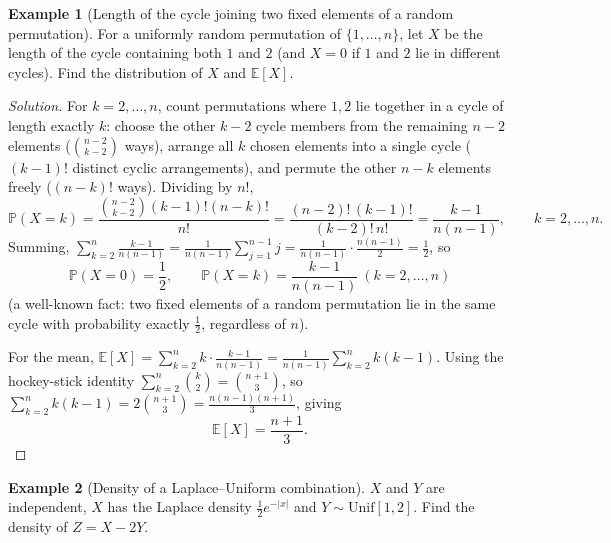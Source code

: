 \documentclass[11pt]{article}
\theoremstyle{definition}
\newtheorem{example}{Example}[section]
\newcommand{\E}{\mathbb{E}}
\begin{document}
\begin{example}[Length of the cycle joining two fixed elements of a random permutation]
For a uniformly random permutation of $\{1,\dots,n\}$, let $X$ be the length of the cycle containing both $1$ and $2$ (and $X=0$ if $1$ and $2$ lie in different cycles). Find the distribution of $X$ and $\E[X]$.
\end{example}

\begin{proof}[Solution]
For $k=2,\dots,n$, count permutations where $1,2$ lie together in a cycle of length exactly $k$: choose the other $k-2$ cycle members from the remaining $n-2$ elements ($\binom{n-2}{k-2}$ ways), arrange all $k$ chosen elements into a single cycle ($(k-1)!$ distinct cyclic arrangements), and permute the other $n-k$ elements freely ($(n-k)!$ ways). Dividing by $n!$,
\[
\mathbb P(X=k)=\frac{\binom{n-2}{k-2}(k-1)!(n-k)!}{n!}=\frac{(n-2)!\,(k-1)!}{(k-2)!\,n!}=\frac{k-1}{n(n-1)}, \qquad k=2,\dots,n.
\]
Summing, $\sum_{k=2}^n\frac{k-1}{n(n-1)}=\frac{1}{n(n-1)}\sum_{j=1}^{n-1}j=\frac{1}{n(n-1)}\cdot\frac{n(n-1)}2=\frac12$, so
\[
\boxed{\mathbb P(X=0)=\frac12, \qquad \mathbb P(X=k)=\frac{k-1}{n(n-1)} \ (k=2,\dots,n)}
\]
(a well-known fact: two fixed elements of a random permutation lie in the same cycle with probability exactly $\tfrac12$, regardless of $n$).

For the mean, $\E[X]=\sum_{k=2}^n k\cdot\frac{k-1}{n(n-1)}=\frac{1}{n(n-1)}\sum_{k=2}^n k(k-1)$. Using the hockey-stick identity $\sum_{k=2}^n\binom k2=\binom{n+1}3$, so $\sum_{k=2}^nk(k-1)=2\binom{n+1}3=\frac{n(n-1)(n+1)}3$, giving
\[
\boxed{\E[X]=\frac{n+1}{3}}.
\]
\end{proof}

\begin{example}[Density of a Laplace–Uniform combination]
$X$ and $Y$ are independent, $X$ has the Laplace density $\tfrac12e^{-|x|}$ and $Y\sim\mathrm{Unif}[1,2]$. Find the density of $Z=X-2Y$.
\end{example}
\end{document}
